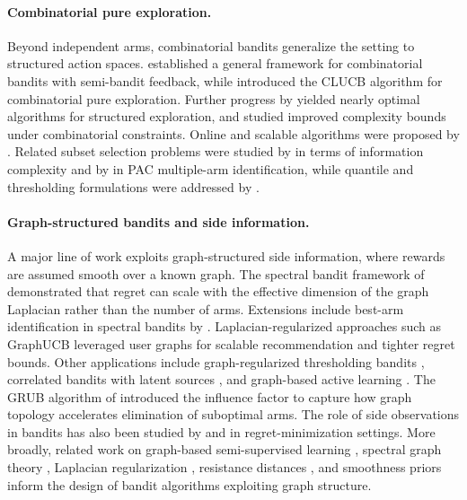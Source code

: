 \documentclass{article}
\begin{document}
\paragraph{Combinatorial pure exploration.}
Beyond independent arms, combinatorial bandits generalize the setting to structured action spaces. \cite{chen2013combinatorial} established a general framework for combinatorial bandits with semi-bandit feedback, while \cite{chen2014combinatorial} introduced the CLUCB algorithm for combinatorial pure exploration. Further progress by \cite{chen2017nearly} yielded nearly optimal algorithms for structured exploration, and \cite{gabillon2016improved} studied improved complexity bounds under combinatorial constraints. Online and scalable algorithms were proposed by \citep{combes2015combinatorial, jourdan2021efficient}. Related subset selection problems were studied by \cite{kaufmann2013information} in terms of information complexity and by \cite{zhou2014optimal} in PAC multiple-arm identification, while quantile and thresholding formulations were addressed by \citep{lipor2018quantile, lejeune2020thresholding}.

\paragraph{Graph-structured bandits and side information.}
A major line of work exploits graph-structured side information, where rewards are assumed smooth over a known graph. The spectral bandit framework of \cite{valko2014spectral} demonstrated that regret can scale with the effective dimension of the graph Laplacian rather than the number of arms. Extensions include best-arm identification in spectral bandits by \cite{kocak2020best}. Laplacian-regularized approaches such as GraphUCB \citep{yang2020laplacian} leveraged user graphs for scalable recommendation and tighter regret bounds. Other applications include graph-regularized thresholding bandits \citep{lejeune2020thresholding}, correlated bandits with latent sources \citep{gupta2020correlated}, and graph-based active learning \citep{ma2013sigma, ma2015active, wang2019distance, dasarathy2015s2}. The GRUB algorithm of \cite{thaker2022maximizing} introduced the influence factor to capture how graph topology accelerates elimination of suboptimal arms. The role of side observations in bandits has also been studied by \cite{atsidakou2022asymptotically} and \cite{wu2015online} in regret-minimization settings. More broadly, related work on graph-based semi-supervised learning \citep{zhu2005semi}, spectral graph theory \citep{chung1997spectral}, Laplacian regularization \citep{ando2007learning}, resistance distances \citep{xiao2003resistance, bapat2010resistance}, and smoothness priors \citep{shamir2011azuma, rao2015collaborative} inform the design of bandit algorithms exploiting graph structure.
\end{document}
